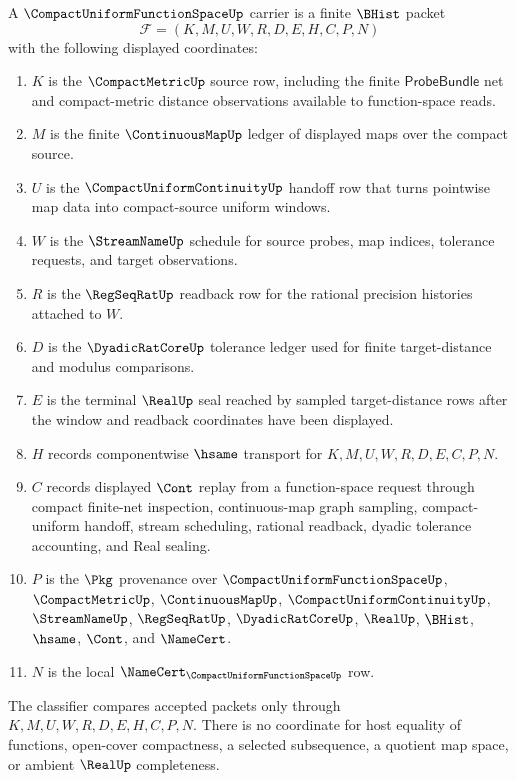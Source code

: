 \begin{definition}
\label{def:compact-uniform-function-space-carrier}
A $\CompactUniformFunctionSpaceUp$ carrier is a finite $\BHist$ packet
$$
\mathcal{F}=(K,M,U,W,R,D,E,H,C,P,N)
$$
with the following displayed coordinates:
\begin{enumerate}
\item $K$ is the $\CompactMetricUp$ source row, including the finite $\mathsf{ProbeBundle}$ net and compact-metric distance observations available to function-space reads.
\item $M$ is the finite $\ContinuousMapUp$ ledger of displayed maps over the compact source.
\item $U$ is the $\CompactUniformContinuityUp$ handoff row that turns pointwise map data into compact-source uniform windows.
\item $W$ is the $\StreamNameUp$ schedule for source probes, map indices, tolerance requests, and target observations.
\item $R$ is the $\RegSeqRatUp$ readback row for the rational precision histories attached to $W$.
\item $D$ is the $\DyadicRatCoreUp$ tolerance ledger used for finite target-distance and modulus comparisons.
\item $E$ is the terminal $\RealUp$ seal reached by sampled target-distance rows after the window and readback coordinates have been displayed.
\item $H$ records componentwise $\hsame$ transport for $K,M,U,W,R,D,E,C,P,N$.
\item $C$ records displayed $\Cont$ replay from a function-space request through compact finite-net inspection, continuous-map graph sampling, compact-uniform handoff, stream scheduling, rational readback, dyadic tolerance accounting, and Real sealing.
\item $P$ is the $\Pkg$ provenance over $\CompactUniformFunctionSpaceUp$, $\CompactMetricUp$, $\ContinuousMapUp$, $\CompactUniformContinuityUp$, $\StreamNameUp$, $\RegSeqRatUp$, $\DyadicRatCoreUp$, $\RealUp$, $\BHist$, $\hsame$, $\Cont$, and $\NameCert$.
\item $N$ is the local $\NameCert_{\CompactUniformFunctionSpaceUp}$ row.
\end{enumerate}
The classifier compares accepted packets only through $K,M,U,W,R,D,E,H,C,P,N$. There is no coordinate for host equality of functions, open-cover compactness, a selected subsequence, a quotient map space, or ambient $\RealUp$ completeness.
\end{definition}

